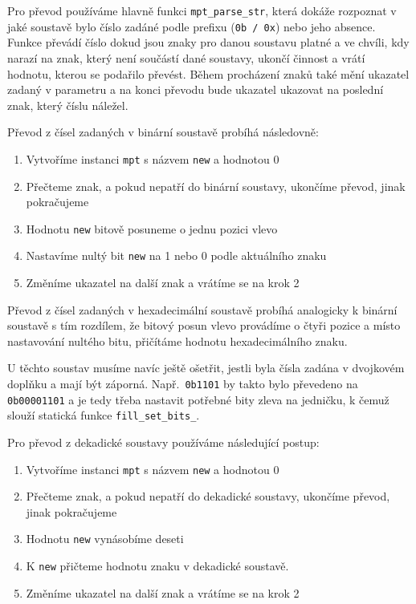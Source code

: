 Pro převod používáme hlavně funkci \verb|mpt_parse_str|, která dokáže rozpoznat v jaké soustavě bylo číslo zadáné podle prefixu (\verb|0b / 0x|) nebo jeho absence. Funkce převádí číslo dokud jsou znaky pro danou soustavu platné a ve chvíli, kdy narazí na znak, který není součástí dané soustavy, ukončí činnost a vrátí hodnotu, kterou se podařilo převést. Během procházení znaků také mění ukazatel zadaný v parametru a na konci převodu bude ukazatel ukazovat na poslední znak, který číslu náležel.

Převod z čísel zadaných v binární soustavě probíhá následovně:
\begin{enumerate}
    \item Vytvoříme instanci \verb|mpt| s názvem \verb|new| a hodnotou 0
    \item Přečteme znak, a pokud nepatří do binární soustavy, ukončíme převod, jinak pokračujeme
    \item Hodnotu \verb|new| bitově posuneme o jednu pozici vlevo
    \item Nastavíme nultý bit \verb|new| na 1 nebo 0 podle aktuálního znaku
    \item Změníme ukazatel na další znak a vrátíme se na krok 2
\end{enumerate}
Převod z čísel zadaných v hexadecimální soustavě probíhá analogicky k binární soustavě s tím rozdílem, že bitový posun vlevo provádíme o čtyři pozice a místo nastavování nultého bitu, přičítáme hodnotu hexadecimálního znaku.

U těchto soustav musíme navíc ještě ošetřit, jestli byla čísla zadána v dvojkovém doplňku a mají být záporná. Např.~\verb|0b1101| by takto bylo převedeno na \verb|0b00001101| a je tedy třeba nastavit potřebné bity zleva na jedničku, k čemuž slouží statická funkce \verb|fill_set_bits_|.

Pro převod z dekadické soustavy používáme následující postup:
\begin{enumerate}
    \item Vytvoříme instanci \verb|mpt| s názvem \verb|new| a hodnotou 0
    \item Přečteme znak, a pokud nepatří do dekadické soustavy, ukončíme převod, jinak pokračujeme
    \item Hodnotu \verb|new| vynásobíme deseti
    \item K \verb|new| přičteme hodnotu znaku v dekadické soustavě.
    \item Změníme ukazatel na další znak a vrátíme se na krok 2
\end{enumerate}

